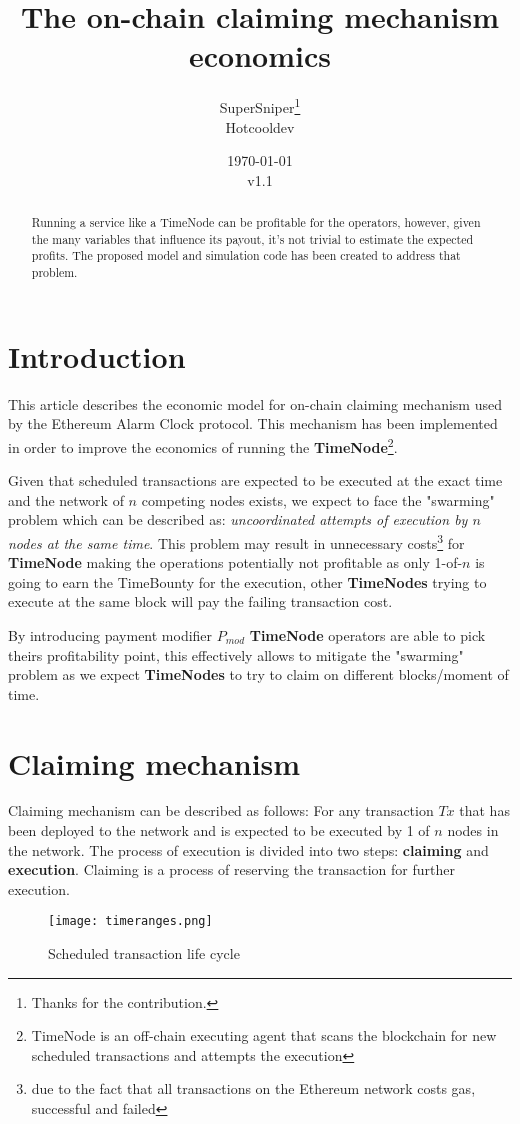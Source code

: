 \documentclass{article}
\title{The on-chain claiming mechanism economics}
\author{SuperSniper\thanks{Thanks for the contribution.}\\Hotcooldev}
\date{\today\\v1.1}
\begin{document}
  \maketitle
  \begin{abstract}
    Running a service like a TimeNode can be profitable for the operators, however, given the many variables that influence its payout,  it's not trivial to estimate the expected profits. The proposed model and simulation code has been created to address that problem.
  \end{abstract}
  \section{Introduction}
  This article describes the economic model for on-chain claiming mechanism used by the Ethereum Alarm Clock protocol. This mechanism has been implemented in order to improve the economics of running the \textbf{TimeNode}\footnote{TimeNode is an off-chain executing agent that scans the blockchain for new scheduled transactions and attempts the execution}. 
  
  Given that scheduled transactions are expected to be executed at the exact time and the network of $n$ competing nodes exists, we expect to face the "swarming" problem which can be described as: \textit{uncoordinated attempts of execution by $n$ nodes at the same time}. This problem may result in unnecessary costs\footnote{due to the fact that all transactions on the Ethereum network costs gas, successful and failed} for \textbf{TimeNode} making the operations potentially not profitable as only 1-of-$n$ is going to earn the TimeBounty for the execution, other \textbf{TimeNodes} trying to execute at the same block will pay the failing transaction cost.
  
  By introducing payment modifier $P_{mod}$ \textbf{TimeNode} operators are able to pick theirs profitability point, this effectively allows to mitigate the "swarming" problem as we expect \textbf{TimeNodes} to try to claim on different blocks/moment of time. 
  \section{Claiming mechanism}
  Claiming mechanism can be described as follows:
  For any transaction $Tx$ that has been deployed to the network and is expected to be executed by 1 of $n$ nodes in the network. The process of execution is divided into two steps:
  \textbf{claiming} and \textbf{execution}. Claiming is a process of reserving the transaction for further execution.
  \begin{figure}
    \texttt{[image: timeranges.png]}
    \caption{Scheduled transaction life cycle}
    \label{fig:boat1}
  \end{figure}
  
\end{document}
